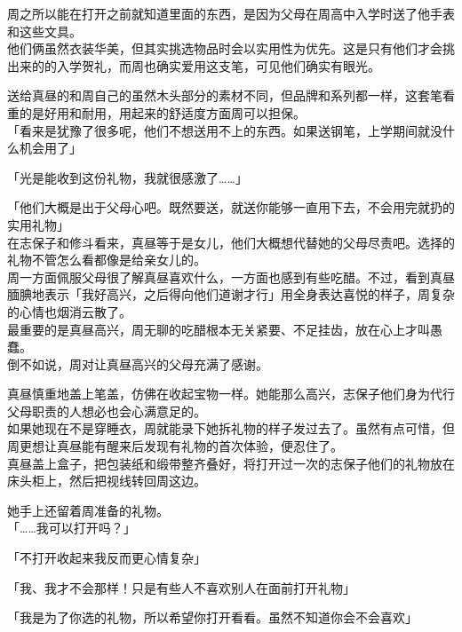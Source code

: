 周之所以能在打开之前就知道里面的东西，是因为父母在周高中入学时送了他手表和这些文具。\\

他们俩虽然衣装华美，但其实挑选物品时会以实用性为优先。这是只有他们才会挑出来的的入学贺礼，而周也确实爱用这支笔，可见他们确实有眼光。

送给真昼的和周自己的虽然木头部分的素材不同，但品牌和系列都一样，这套笔看重的是好用和耐用，用起来的舒适度方面周可以担保。\\

「看来是犹豫了很多呢，他们不想送用不上的东西。如果送钢笔，上学期间就没什么机会用了」

「光是能收到这份礼物，我就很感激了……」

「他们大概是出于父母心吧。既然要送，就送你能够一直用下去，不会用完就扔的实用礼物」\\

在志保子和修斗看来，真昼等于是女儿，他们大概想代替她的父母尽责吧。选择的礼物不管怎么看都像是给亲女儿的。\\

周一方面佩服父母很了解真昼喜欢什么，一方面也感到有些吃醋。不过，看到真昼腼腆地表示「我好高兴，之后得向他们道谢才行」用全身表达喜悦的样子，周复杂的心情也烟消云散了。\\

最重要的是真昼高兴，周无聊的吃醋根本无关紧要、不足挂齿，放在心上才叫愚蠢。\\

倒不如说，周对让真昼高兴的父母充满了感谢。

真昼慎重地盖上笔盖，仿佛在收起宝物一样。她能那么高兴，志保子他们身为代行父母职责的人想必也会心满意足的。\\

如果她现在不是穿睡衣，周就能录下她拆礼物的样子发过去了。虽然有点可惜，但周更想让真昼能有醒来后发现有礼物的首次体验，便忍住了。\\
%

真昼盖上盒子，把包装纸和缎带整齐叠好，将打开过一次的志保子他们的礼物放在床头柜上，然后把视线转回周这边。

她手上还留着周准备的礼物。\\

「……我可以打开吗？」

「不打开收起来我反而更心情复杂」

「我、我才不会那样！只是有些人不喜欢别人在面前打开礼物」

「我是为了你选的礼物，所以希望你打开看看。虽然不知道你会不会喜欢」\\

